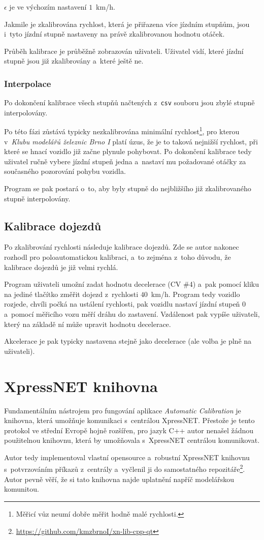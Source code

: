 $\epsilon$ je ve výchozím nastavení $1$~km/h.

Jakmile je zkalibrována rychlost, která je přiřazena více jízdním stupňům,
jsou i~tyto jízdní stupně nastaveny na právě zkalibrovanou hodnotu otáček.

Průběh kalibrace je průběžně zobrazován uživateli. Uživatel vidí, které
jízdní stupně jsou již zkalibrovány a~které ještě ne.

\subsubsection{Interpolace}

Po dokončení kalibrace všech stupňů načtených z~\texttt{csv} souboru jsou zbylé
stupně interpolovány.

Po této fázi zůstává typicky nezkalibrována minimální rychlost\footnote{Měřicí
vůz neumí dobře měřit hodně malé rychlosti.}, pro kterou v~\textit{Klubu
modelářů železnic Brno I} platí úzus, že je to taková nejnižší rychlost, při
které se hnací vozidlo již začne plynule pohybovat. Po dokončení kalibrace tedy
uživatel ručně vybere jízdní stupeň jedna a~nastaví mu požadované otáčky za
současného pozorování pohybu vozidla.

Program se pak postará o~to, aby byly stupně do nejbližšího již zkalibrovaného
stupně interpolovány.

\subsection{Kalibrace dojezdů}

Po zkalibrování rychlosti následuje kalibrace dojezdů. Zde se autor nakonec
rozhodl pro poloautomatickou kalibraci, a~to zejména z~toho důvodu, že kalibrace
dojezdů je již velmi rychlá.

Program uživateli umožní zadat hodnotu decelerace (\gls{CV} \#4) a~pak pomocí
kliku na jediné tlačítko změřit dojezd z~rychlosti $40$~km/h. Program tedy
vozidlo rozjede, chvíli počká na ustálení rychlosti, pak vozidlu nastaví jízdní
stupeň $0$ a~pomocí měřicího vozu měří dráhu do zastavení. Vzdálenost pak
vypíše uživateli, který na základě ní může upravit hodnotu decelerace.

Akcelerace je pak typicky nastavena stejně jako decelerace (ale volba je plně
na uživateli).

\section{XpressNET knihovna}
\label{sec:xn-lib}

Fundamentálním nástrojem pro fungování aplikace \textit{Automatic Calibration}
je knihovna, která umožňuje komunikaci s~centrálou XpressNET. Přestože je tento
protokol ve střední Evropě hojně rozšířen, pro jazyk C++ autor nenašel žádnou
použitelnou knihovnu, která by umožňovala s~XpressNET centrálou komunikovat.

Autor tedy implementoval vlastní opensource a~robustní XpressNET knihovnu
s~potvrzováním příkazů z~centrály a~vyčlenil ji do samostatného
repozitáře\footnote{\url{https://github.com/kmzbrnoI/xn-lib-cpp-qt}}. Autor
pevně věří, že si tato knihovna najde uplatnění napříč modelářskou komunitou.
